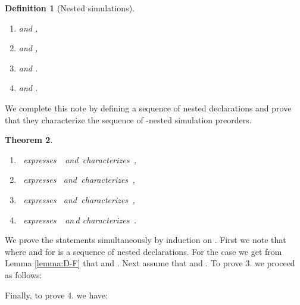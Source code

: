 \documentclass[submission]{eptcs}
\newtheorem{theorem}{Theorem}[section]
\newtheorem{definition}[theorem]{Definition}
\newenvironment{proof}[1][Proof]{\begin{trivlist}
\item[\hskip \labelsep {\bfseries #1}]}{\end{trivlist}}
\begin{document}
\begin{definition}[Nested simulations]\quad
\begin{enumerate}
\item  and , 
\item  and
    ,
\item  and 
  .
\item  and 
  .
\end{enumerate} 
\end{definition}
We complete this note by defining a sequence of nested declarations
and prove that they characterize the sequence of -nested
simulation preorders.
\begin{theorem}\quad
\begin{enumerate}
\item \,  expresses\, \, and\, characterizes\,
    ,
  \item \, expresses
    \, and\, characterizes\,
    ,
  \item \, expresses
    \, and\, characterizes\, ,
  \item \,
    expresses\, \, an\,d characterizes\,
    .
\end{enumerate}
\end{theorem}
\begin{proof}
  We prove the statements simultaneously by induction on . First we
  note that  where  and
   for  is a sequence of nested
  declarations.
 For the
  case  we get from Lemma \ref{lemma:D-F} that
   and
  .  Next assume that
   and
  . To prove 3. we
  proceed as follows:

Finally, to prove 4. we have:

\end{proof}



\nocite{*}


\end{document}
